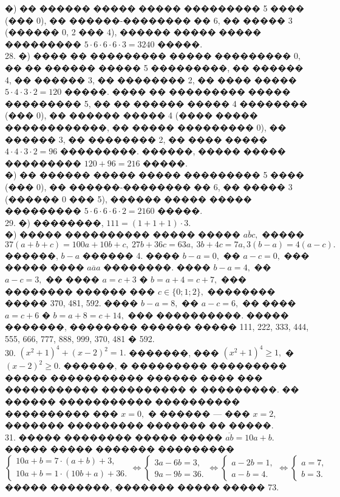 \documentclass[12pt]{article}
\begin{document}
�) �� ������ ����� ����� ��������� 5 ���� (��� 0), �� ������-�������� �� 6, �� ����� 3 (������ 0, 2 ��� 4), ������ ����� ����� ��������� $5\cdot6\cdot6\cdot6\cdot3=3240$ �����.\\
28. �) ���� �� ��������� ����� ��������� 0, �� �� ������ ����� 5 ���������, �� ������ 4, �� ������ 3, �� �������� 2, �� ���� ����� $5\cdot4\cdot3\cdot2=120$ �����. ���� �� ��������� ����� ��������� 5, �� �� ������ ����� 4 �������� (��� 0), �� ������ ����� 4 (���� ����� ������������, �� ����� ��������� 0), �� ������ 3, �� �������� 2, �� ���� ����� $4\cdot4\cdot3\cdot2=96$ ���������. ������, ����� ����� ��������� $120+96=216$ �����.\\
�) �� ������ ����� ����� ��������� 5 ���� (��� 0), �� ������-�������� �� 6, �� ����� 3 (������ 0 ��� 5), ������ ����� ����� ��������� $5\cdot6\cdot6\cdot6\cdot2=2160$ �����.\\
29. �) ��������, $111=(1+1+1)\cdot3.$\\
�) ����� ���������� ����� ����� $\overline{abc},$ ����� $37(a+b+c)=100a+10b+c,\ 27b+36c=63a,\ 3b+4c=7a, 3(b-a)=4(a-c).$ ������, $b-a$ ������ 4. ���� $b-a=0,$ �� $a-c=0,$ ��� ����� ���� $\overline{aaa}$ ��������. ���� $b-a=4,$ �� $a-c=3,$ �� ���� $a=c+3$ � $b=a+4=c+7,$ ��� �������� ������ ��� $c\in\{0;1;2\},$ �������� ����� 370, 481, 592. ���� $b-a=8,$ �� $a-c=6,$ �� ���� $a=c+6$ � $b=a+8=c+14,$ ��� ����������. ����� �������, �������� ������ ����� 111, 222, 333, 444, 555, 666, 777, 888, 999, 370, 481 � 592.\\
30. $(x^2+1)^4+(x-2)^2=1.$ �������, ��� $(x^2+1)^4\geqslant1,$ � $(x-2)^2\geqslant0.$ ������, � ��������� ��������� ����� ����������� ������ ���� ��� ����������� ���������� � ���������. �� ������ ����������� ���������� ���������� ��� $x=0,$ � ������ --- ��� $x=2,$ ������� ��������� ������� �� �����.\\
31. ����� �������� ����� ����� $\overline{ab}=10a+b.$ ����� ����� ������� ��������� \\$\begin{cases} 10a+b=7\cdot(a+b)+3,\\ 10a+b=1\cdot(10b+a)+36.\end{cases}\Leftrightarrow \begin{cases} 3a-6b=3,\\ 9a-9b=36.\end{cases}\Leftrightarrow \begin{cases} a-2b=1,\\ a-b=4.\end{cases}
\Leftrightarrow \begin{cases} a=7,\\ b=3.\end{cases}$ ����� �������, ������� ����� ����� 73.\\
\end{document}
